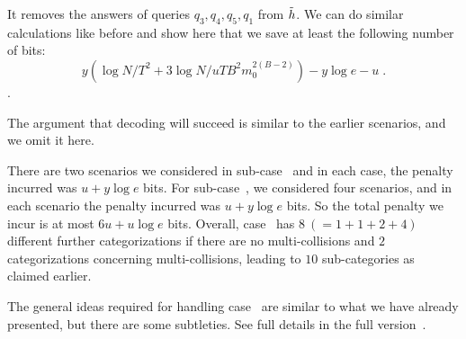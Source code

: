 {\begin{itemize}
\end{itemize}
It removes the answers of queries $q_3,q_4,q_5,q_1$ from $\tilde{h}$.
We can do similar calculations like before and show here that we save at least the following number of bits: $$y(\log N/T^2 +3\log N/uTB^2m_0^{2(B-2)})- y\log e -u\;.$$.

The argument that decoding will succeed is similar to the earlier scenarios, and we omit it here.

\begin{remark}
There are two scenarios we considered in sub-case~ and in each case, the penalty incurred was $u+y\log e$ bits. For sub-case~, we considered four scenarios, and in each scenario the penalty incurred was $u+y\log e$ bits. So the total penalty we incur is at most $6u+u\log e$ bits. 
Overall, case~ has $8~(=1+1+2+4)$ different further categorizations if there are no multi-collisions and $2$ categorizations concerning multi-collisions, leading to $10$ sub-categories as claimed earlier.
\end{remark}
}
\ifnum{}
\compcasesix
\else
The general ideas required for handling case~ are similar to what we have already presented, but there are some subtleties. See full details in the full version~\cite{full}.
\fi